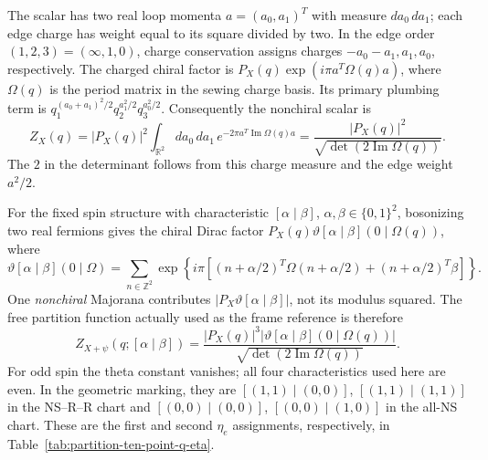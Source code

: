 The scalar has two real loop momenta $a=(a_0,a_1)^T$ with measure
$da_0\,da_1$; each edge charge has weight equal to its square
divided by two. In the edge order $(1,2,3)=(\infty,1,0)$,
charge conservation assigns charges $-a_0-a_1,a_1,a_0$,
respectively. The charged
chiral factor is $P_X(q)\exp(i\pi a^T\Omega(q)a)$, where
$\Omega(q)$ is the period matrix in the sewing charge basis.
Its primary plumbing term is
$q_1^{(a_0+a_1)^2/2}q_2^{a_1^2/2}q_3^{a_0^2/2}$.
Consequently the nonchiral scalar is
\begin{equation}
 Z_X(q)=|P_X(q)|^2\int_{\mathbb R^2}da_0\,da_1\,
           e^{-2\pi a^T\operatorname{Im}\Omega(q)a}
 =\frac{|P_X(q)|^2}
        {\sqrt{\det(2\operatorname{Im}\Omega(q))}}.
 \label{eq:partition-free-scalar}
\end{equation}
The $2$ in the determinant follows from this charge measure and the
edge weight $a^2/2$.

For the fixed spin structure with characteristic
$[\alpha\mid\beta]$, $\alpha,\beta\in\{0,1\}^2$, bosonizing two
real fermions gives the chiral Dirac factor
$P_X(q)\vartheta[\alpha\mid\beta](0\mid\Omega(q))$, where
\begin{equation}
 \vartheta[\alpha\mid\beta](0\mid\Omega)
 =\sum_{n\in\mathbb Z^2}
 \exp\!\left\{i\pi\left[
 (n+\alpha/2)^T\Omega(n+\alpha/2)
 +(n+\alpha/2)^T\beta\right]\right\}.
 \label{eq:partition-free-theta}
\end{equation}
One \emph{nonchiral} Majorana contributes
$|P_X\vartheta[\alpha\mid\beta]|$, not its modulus squared.
The free partition function actually used as the frame reference is
therefore
\begin{equation}
 Z_{X+\psi}(q;[\alpha\mid\beta])
 =\frac{|P_X(q)|^3
        |\vartheta[\alpha\mid\beta](0\mid\Omega(q))|}
        {\sqrt{\det(2\operatorname{Im}\Omega(q))}}.
 \label{eq:partition-free-reference}
\end{equation}
For odd spin the theta constant vanishes; all four characteristics
used here are even. In the geometric marking, they are
$[(1,1)\mid(0,0)]$, $[(1,1)\mid(1,1)]$ in the NS--R--R chart
and $[(0,0)\mid(0,0)]$, $[(0,0)\mid(1,0)]$ in the all-NS chart.
These are the first and second $\eta_e$ assignments, respectively,
in Table~\ref{tab:partition-ten-point-q-eta}.

